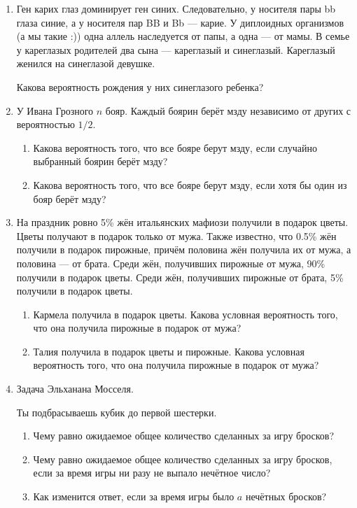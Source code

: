 \documentclass[12pt]{article}
\begin{document}
\begin{enumerate}[resume]
\item  Ген карих глаз доминирует ген синих. 
Следовательно, у носителя пары bb глаза синие, а у носителя пар BB и Bb — карие. 
У диплоидных организмов (а мы такие :)) одна аллель наследуется от папы, а одна — от мамы. 
В семье у кареглазых родителей два сына — кареглазый и синеглазый. 
Кареглазый женился на синеглазой девушке. 

Какова вероятность рождения у них синеглазого ребенка?

\item У Ивана Грозного $n$ бояр. 
Каждый боярин берёт мзду независимо от других с вероятностью $1/2$.

\begin{enumerate}
  \item Какова вероятность того, что все бояре берут мзду, если случайно выбранный боярин берёт мзду?
  \item Какова вероятность того, что все бояре берут мзду, если хотя бы один из бояр берёт мзду?
\end{enumerate}

\item На праздник ровно 5\% жён итальянских мафиози получили в подарок цветы.
Цветы получают в подарок только от мужа.
Также известно, что 0.5\% жён получили в подарок пирожные, причём половина жён получила их от мужа,
а половина — от брата.
Среди жён, получивших пирожные от мужа, 90\% получили в подарок цветы.
Среди жён, получивших пирожные от брата, 5\% получили в подарок цветы.

\begin{enumerate}
  \item Кармела получила в подарок цветы. Какова условная вероятность того, что она получила
      пирожные в подарок от мужа?

 \item Талия получила в подарок цветы и пирожные. Какова условная вероятность того, что она
получила пирожные в подарок от мужа?
\end{enumerate}

\item Задача Эльханана Мосселя.

Ты подбрасываешь кубик до первой шестерки.

\begin{enumerate}
 \item Чему равно ожидаемое общее количество сделанных за игру бросков?
  \item Чему равно ожидаемое общее количество сделанных за игру бросков, если за время игры ни разу не выпало нечётное число?
  \item Как изменится ответ, если за время игры было $a$ нечётных бросков?
\end{enumerate}


\end{enumerate}
\end{document}

